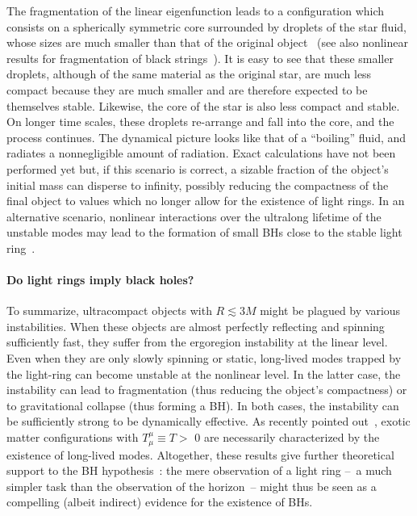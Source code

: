 \documentclass[11pt]{article}
\numberwithin{equation}{section} %
\begin{document}
The fragmentation of the linear eigenfunction leads to a configuration which consists on a spherically symmetric core surrounded by droplets of the star fluid, whose sizes are much smaller than that of the original object~\cite{Cardoso:2014sna} (see also nonlinear results for fragmentation of black strings~\cite{Lehner:2010pn}). It is easy to see that these smaller droplets, although of the same material as the original star, are much less compact because they are much smaller and are therefore expected to be themselves stable.
Likewise, the core of the star is also less compact and stable. On longer time scales, these droplets re-arrange and fall into the core, and the process continues. The dynamical picture looks like that of a ``boiling'' fluid, and radiates a nonnegligible amount of radiation. Exact calculations have not been performed yet but, if this scenario is correct, a sizable fraction of the object's initial mass can disperse to infinity, possibly reducing the compactness of the final object to values which no longer allow for the existence of light rings. 
%
In an alternative scenario, nonlinear interactions over the ultralong lifetime of the unstable modes may lead to the formation of small BHs close to the stable light ring~\cite{Cardoso:2014sna}.

\paragraph{Do light rings imply black holes?}
To summarize, ultracompact objects with $R\lesssim 3M$ might be plagued by various instabilities. When these objects 
are 
almost perfectly reflecting and spinning sufficiently fast, they suffer from the ergoregion instability at the linear 
level. Even when they are only slowly spinning or static, long-lived modes trapped by the light-ring can become 
unstable at the nonlinear level. In the latter case, the instability can lead to fragmentation (thus reducing the 
object's compactness) or to gravitational collapse (thus forming a BH). In both cases, the instability can be 
sufficiently strong to be dynamically effective. As recently pointed out~\cite{Hod:2014ena}, 
exotic matter configurations with $T^\mu_\mu\equiv T >$ 0 are necessarily 
characterized by the existence of long-lived modes. 
Altogether, these results give further theoretical support to the BH hypothesis~\cite{Cardoso:2019rvt}: the mere 
observation of a light ring --~a much simpler task than the observation of the horizon~-- might thus be seen as a 
compelling (albeit indirect) evidence for the existence of BHs.
\end{document}
